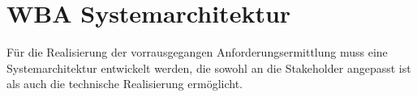 
\chapter{WBA Systemarchitektur}

Für die Realisierung der vorrausgegangen Anforderungsermittlung muss eine Systemarchitektur entwickelt werden, die sowohl an die Stakeholder angepasst ist als auch die technische Realisierung ermöglicht.\\



\newpage



\newpage




%


%
